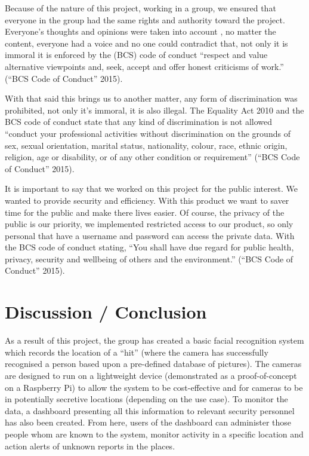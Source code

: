 \documentclass[
  english,
  a4paper,
,tablecaptionabove
]{scrartcl}
\begin{document}
Because of the nature of this project, working in a group, we ensured
that everyone in the group had the same rights and authority toward the
project. Everyone's thoughts and opinions were taken into account , no
matter the content, everyone had a voice and no one could contradict
that, not only it is immoral it is enforced by the (BCS) code of conduct
\enquote{respect and value alternative viewpoints and, seek, accept and
offer honest criticisms of work.} (``BCS Code of Conduct'' 2015).

With that said this brings us to another matter, any form of
discrimination was prohibited, not only it's immoral, it is also
illegal. The Equality Act 2010 and the BCS code of conduct state that
any kind of discrimination is not allowed \enquote{conduct your
professional activities without discrimination on the grounds of sex,
sexual orientation, marital status, nationality, colour, race, ethnic
origin, religion, age or disability, or of any other condition or
requirement} (``BCS Code of Conduct'' 2015).

It is important to say that we worked on this project for the public
interest. We wanted to provide security and efficiency. With this
product we want to saver time for the public and make there lives
easier. Of course, the privacy of the public is our priority, we
implemented restricted access to our product, so only personal that have
a username and password can access the private data. With the BCS code
of conduct stating, \enquote{You shall have due regard for public
health, privacy, security and wellbeing of others and the environment.}
(``BCS Code of Conduct'' 2015).

\newpage

\hypertarget{discussion-conclusion}{%
\section{Discussion / Conclusion}\label{discussion-conclusion}}

As a result of this project, the group has created a basic facial
recognition system which records the location of a \enquote{hit} (where
the camera has successfully recognised a person based upon a pre-defined
database of pictures). The cameras are designed to run on a lightweight
device (demonstrated as a proof-of-concept on a Raspberry Pi) to allow
the system to be cost-effective and for cameras to be in potentially
secretive locations (depending on the use case). To monitor the data, a
dashboard presenting all this information to relevant security personnel
has also been created. From here, users of the dashboard can administer
those people whom are known to the system, monitor activity in a
specific location and action alerts of unknown reports in the places.
\end{document}
